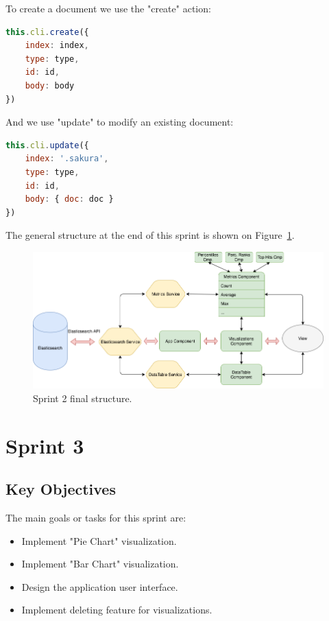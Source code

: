 \documentclass[a4paper, 12pt, english]{book}
\begin{document}
To create a document we use the "create" action:
\begin{lstlisting}[language=javascript]
this.cli.create({
	index: index,
	type: type,
	id: id,
	body: body
})
\end{lstlisting}

And we use "update" to modify an existing document:
\begin{lstlisting}[language=javascript]
this.cli.update({
	index: '.sakura',
	type: type,
	id: id,
	body: { doc: doc }
})
\end{lstlisting}

The general structure at the end of this sprint is shown on Figure~\ref{fig:sprint2-architecture-2}.
\begin{figure}
  \centering
  \includegraphics[width=13cm, keepaspectratio]{img/sprint2_architecture_2}
  \caption{Sprint 2 final structure.}
  \label{fig:sprint2-architecture-2}
\end{figure}


\section{Sprint 3}
\label{sec:sprint-3}

\subsection{Key Objectives}
\label{sec:key-objectives}
The main goals or tasks for this sprint are:
\begin{itemize}
    \item Implement "Pie Chart" visualization.
    \item Implement "Bar Chart" visualization.
    \item Design the application user interface.
    \item Implement deleting feature for visualizations.
\end{itemize}
\end{document}
